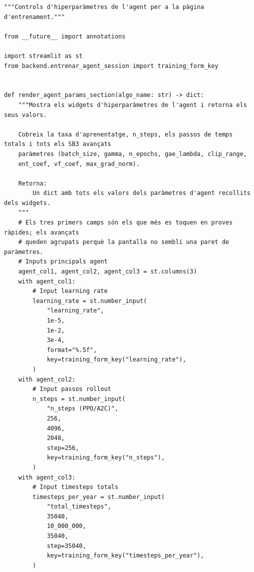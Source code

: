 \documentclass[10pt,a4paper]{article}
\begin{document}
\begin{lstlisting}[style=studioPython,caption={page\_components/training\_agent.py},label={lst:page-components-training-agent-py}]
"""Controls d'hiperparàmetres de l'agent per a la pàgina d'entrenament."""

from __future__ import annotations

import streamlit as st
from backend.entrenar_agent_session import training_form_key


def render_agent_params_section(algo_name: str) -> dict:
    """Mostra els widgets d'hiperparàmetres de l'agent i retorna els seus valors.

    Cobreix la taxa d'aprenentatge, n_steps, els passos de temps totals i tots els SB3 avançats
    paràmetres (batch_size, gamma, n_epochs, gae_lambda, clip_range,
    ent_coef, vf_coef, max_grad_norm).

    Retorna:
        Un dict amb tots els valors dels paràmetres d'agent recollits dels widgets.
    """
    # Els tres primers camps són els que més es toquen en proves ràpides; els avançats
    # queden agrupats perquè la pantalla no sembli una paret de paràmetres.
    # Inputs principals agent
    agent_col1, agent_col2, agent_col3 = st.columns(3)
    with agent_col1:
        # Input learning rate
        learning_rate = st.number_input(
            "learning_rate",
            1e-5,
            1e-2,
            3e-4,
            format="%.5f",
            key=training_form_key("learning_rate"),
        )
    with agent_col2:
        # Input passos rollout
        n_steps = st.number_input(
            "n_steps (PPO/A2C)",
            256,
            4096,
            2048,
            step=256,
            key=training_form_key("n_steps"),
        )
    with agent_col3:
        # Input timesteps totals
        timesteps_per_year = st.number_input(
            "total_timesteps",
            35040,
            10_000_000,
            35040,
            step=35040,
            key=training_form_key("timesteps_per_year"),
        )


\end{lstlisting}
\end{document}
